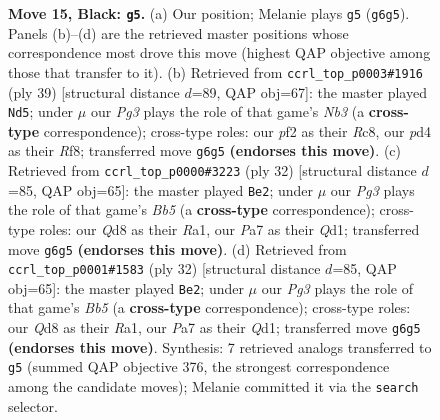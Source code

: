 \documentclass[11pt]{article}
\begin{document}
\begin{figure}[p]
\caption{\textbf{Move 15, Black: \texttt{g5}.} (a) Our position; Melanie plays \texttt{g5} (\texttt{g6g5}). Panels (b)--(d) are the retrieved master positions whose correspondence most drove this move (highest QAP objective among those that transfer to it). (b) Retrieved from \texttt{ccrl\_top\_p0003\#1916} (ply 39) [structural distance $d$=89, QAP obj=67]: the master played \texttt{Nd5}; under $\mu$ our \emph{Pg3} plays the role of that game's \emph{Nb3} (a \textbf{cross-type} correspondence); cross-type roles: our \emph{p}f2 as their \emph{R}c8, our \emph{p}d4 as their \emph{R}f8; transferred move \texttt{g6g5} \textbf{(endorses this move)}. (c) Retrieved from \texttt{ccrl\_top\_p0000\#3223} (ply 32) [structural distance $d$=85, QAP obj=65]: the master played \texttt{Be2}; under $\mu$ our \emph{Pg3} plays the role of that game's \emph{Bb5} (a \textbf{cross-type} correspondence); cross-type roles: our \emph{Q}d8 as their \emph{R}a1, our \emph{P}a7 as their \emph{Q}d1; transferred move \texttt{g6g5} \textbf{(endorses this move)}. (d) Retrieved from \texttt{ccrl\_top\_p0001\#1583} (ply 32) [structural distance $d$=85, QAP obj=65]: the master played \texttt{Be2}; under $\mu$ our \emph{Pg3} plays the role of that game's \emph{Bb5} (a \textbf{cross-type} correspondence); cross-type roles: our \emph{Q}d8 as their \emph{R}a1, our \emph{P}a7 as their \emph{Q}d1; transferred move \texttt{g6g5} \textbf{(endorses this move)}. Synthesis: 7 retrieved analogs transferred to \texttt{g5} (summed QAP objective 376, the strongest correspondence among the candidate moves); Melanie committed it via the \texttt{search} selector.}
\label{fig:thought-m29}
\end{figure}

\clearpage
\end{document}
